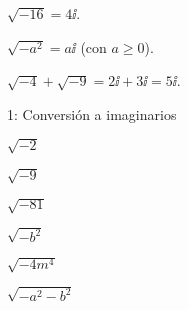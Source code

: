 
\begin{ejemplos}
  \item \(\sqrt{-16}=4\ii\).
  \item \(\sqrt{-a^2}=a\ii\) (con \(a\ge 0\)).
  \item \(\sqrt{-4}+\sqrt{-9}=2\ii+3\ii=5\ii\).
\end{ejemplos}

\begin{actividad}{1: Conversión a imaginarios}
  \item \(\sqrt{-2}\)
  \item \(\sqrt{-9}\)
  \item \(\sqrt{-81}\)
  \item \(\sqrt{-b^2}\)
  \item \(\sqrt{-4m^4}\)
  \item \(\sqrt{-a^2-b^2}\)
\end{actividad}